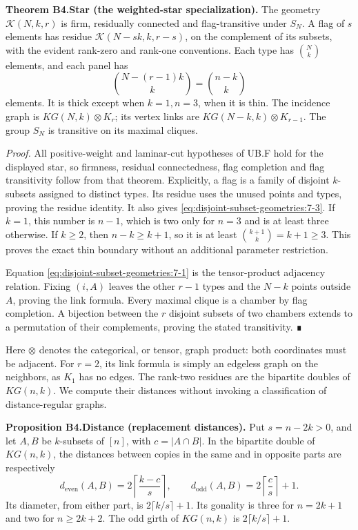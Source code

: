 \textbf{Theorem B4.Star (the weighted-star specialization).} The geometry \(\mathcal K(N,k,r)\) is firm, residually connected and flag-transitive under \(S_N\). A flag of \(s\) elements has residue \(\mathcal K(N-sk,k,r-s)\), on the complement of its subsets, with the evident rank-zero and rank-one conventions. Each type has \(\binom Nk\) elements, and each panel has \begin{equation}
\binom{N-(r-1)k}{k}=\binom{n-k}{k}
\label{eq:disjoint-subset-geometries:7-3}
\end{equation} elements. It is thick except when \(k=1,n=3\), when it is thin. The incidence graph is \(KG(N,k)\otimes K_r\); its vertex links are \(KG(N-k,k)\otimes K_{r-1}\). The group \(S_N\) is transitive on its maximal cliques.

\emph{Proof.} All positive-weight and laminar-cut hypotheses of UB.F hold for the displayed star, so firmness, residual connectedness, flag completion and flag transitivity follow from that theorem. Explicitly, a flag is a family of disjoint \(k\)-subsets assigned to distinct types. Its residue uses the unused points and types, proving the residue identity. It also gives \eqref{eq:disjoint-subset-geometries:7-3}. If \(k=1\), this number is \(n-1\), which is two only for \(n=3\) and is at least three otherwise. If \(k\geq2\), then \(n-k\geq k+1\), so it is at least \(\binom{k+1}k=k+1\geq3\). This proves the exact thin boundary without an additional parameter restriction.

Equation \eqref{eq:disjoint-subset-geometries:7-1} is the tensor-product adjacency relation. Fixing \((i,A)\) leaves the other \(r-1\) types and the \(N-k\) points outside \(A\), proving the link formula. Every maximal clique is a chamber by flag completion. A bijection between the \(r\) disjoint subsets of two chambers extends to a permutation of their complements, proving the stated transitivity. ∎

Here \(\otimes\) denotes the categorical, or tensor, graph product: both coordinates must be adjacent. For \(r=2\), its link formula is simply an edgeless graph on the neighbors, as \(K_1\) has no edges. The rank-two residues are the bipartite doubles of \(KG(n,k)\). We compute their distances without invoking a classification of distance-regular graphs.

\textbf{Proposition B4.Distance (replacement distances).} Put \(s=n-2k>0\), and let \(A,B\) be \(k\)-subsets of \([n]\), with \(c=|A\cap B|\). In the bipartite double of \(KG(n,k)\), the distances between copies in the same and in opposite parts are respectively \begin{equation}
d_{\mathrm{even}}(A,B)=2\left\lceil\frac{k-c}{s}\right\rceil,
\qquad
d_{\mathrm{odd}}(A,B)=2\left\lceil\frac{c}{s}\right\rceil+1.
\label{eq:disjoint-subset-geometries:7-4}
\end{equation} Its diameter, from either part, is \(2\lceil k/s\rceil+1\). Its gonality is three for \(n=2k+1\) and two for \(n\geq2k+2\). The odd girth of \(KG(n,k)\) is \(2\lceil k/s\rceil+1\).

